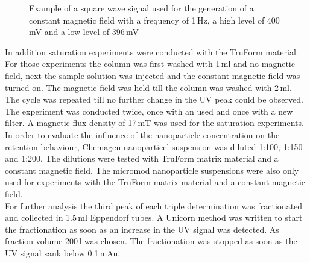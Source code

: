 \begin{figure}[h]
\centering

\caption[Example of a square wave signal]{Example of a square wave signal used for the generation of a constant magnetic field with a frequency of 1\,Hz, a high level of 400\,mV and a low level of 396\,mV
\label{fig:waveform}
}
\end{figure}


In addition saturation experiments were conducted with the TruForm material. For those experiments the column was first washed with 1\,ml and no magnetic field, next the sample solution was injected and the constant magnetic field was turned on. The magnetic field was held till the column was washed with 2\,ml. The cycle was repeated till no further change in the UV peak could be observed. The experiment was conducted twice, once with an used and once with a new filter. A magnetic flux density of 17\,mT was used for the saturation experiments.\\
In order to evaluate the influence of the nanoparticle concentration on the retention behaviour, Chemagen nanoparticel suspension was diluted 1:100, 1:150 and 1:200. The dilutions were tested with TruForm matrix material and a constant magnetic field. The micromod nanoparticle suspensions were also only used for experiments with the TruForm matrix material and a constant magnetic field.\\
For further analysis the third peak of each triple determination was fractionated and collected in 1.5\,ml Eppendorf tubes. A Unicorn method was written to start the fractionation as soon as an increase in the UV signal was detected. As fraction volume 200\,\textmu l was chosen. The fractionation was stopped as soon as the UV signal sank below 0.1\,mAu. 
 

